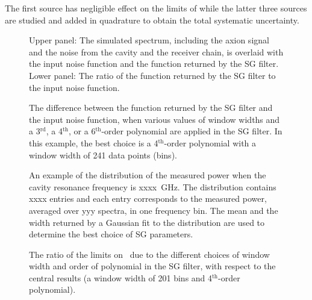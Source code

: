 The first source has negligible effect on the limits of \gagg while the 
latter three sources are studied and added in quadrature to obtain the total 
systematic uncertainty. 

\begin{figure} [htbp]
  \centering
  \caption{Upper panel: 
 The simulated spectrum, including the axion signal and 
 the noise from the cavity and the receiver chain, 
 is overlaid with the input noise function and the function returned by 
 the SG filter. Lower panel: The ratio of the function returned by the SG 
 filter to the input noise function.}
  \label{fig:sgcompare}
\end{figure}


\begin{figure} [htbp]
  \centering
  \caption{The difference between the function returned by the SG filter 
  and the input noise function, when various values of window widths and 
  a 3$^\text{rd}$, a 4$^\text{th}$, or a 
  6$^\text{th}$-order polynomial are applied in the SG filter. In this 
  example, the best choice is a 4$^\text{th}$-order polynomial with 
  a window width of 241 data points (bins). }
  \label{fig:sgoptimize}
\end{figure}
 


\begin{figure} [htbp]
  \centering
  \caption{An example of the distribution of the measured power when 
the cavity resonance frequency is xxxx~GHz. The distribution contains 
xxxx entries and each entry corresponds to the measured power, averaged
over yyy spectra, in one frequency bin. The mean and the width returned by 
a Gaussian fit to the distribution are used to determine the best choice of 
SG parameters.}
  \label{fig:noisegauss}
\end{figure}
 

\begin{figure} [htbp]
  \centering
  \caption{The ratio of the limits on \gagg\ due to the different choices 
 of window width and order of polynomial in the SG filter, with respect to 
 the central results (a window width of 201 bins and 4$^\text{th}$-order 
 polynomial). }
  \label{fig:syssgfilter}
\end{figure}
 

